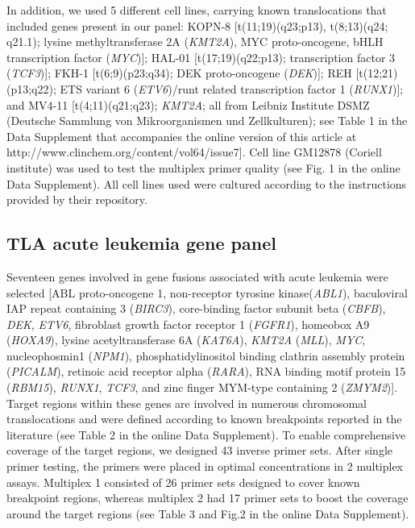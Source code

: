 In addition, we used 5 different cell lines, carrying known translocations that included genes present in our panel: KOPN-8 [t(11;19)(q23;p13), t(8;13)(q24; q21.1); lysine methyltransferase 2A (\textsl{KMT2A}), MYC proto-oncogene, bHLH transcription factor (\textsl{MYC})]; HAL-01 [t(17;19)(q22;p13); transcription factor 3 (\textsl{TCF3})]; FKH-1 [t(6;9)(p23;q34); DEK proto-oncogene (\textsl{DEK})]; REH [t(12;21)(p13;q22); ETS variant 6 (\textsl{ETV6})/runt related transcription factor 1 (\textsl{RUNX1})]; and MV4-11 [t(4;11)(q21;q23); \textsl{KMT2A}; all from Leibniz Institute DSMZ (Deutsche Sammlung von Mikroorganismen und Zellkulturen); see Table 1 in the Data Supplement that accompanies the online version of this article at http://www.clinchem.org/content/vol64/issue7]. 
Cell line GM12878 (Coriell institute) was used to test the multiplex primer quality (see Fig. 1 in the online Data Supplement). 
All cell lines used were cultured according to the instructions provided by their repository.

\subsection{TLA acute leukemia gene panel}
Seventeen genes involved in gene fusions associated with acute leukemia were selected [ABL proto-oncogene 1, non-receptor tyrosine kinase(\textsl{ABL1}), baculoviral IAP repeat containing 3 (\textsl{BIRC3}), core-binding factor subunit beta (\textsl{CBFB}), \textsl{DEK}, \textsl{ETV6}, fibroblast growth factor receptor 1 (\textsl{FGFR1}), homeobox A9 (\textsl{HOXA9}), lysine acetyltransferase 6A (\textsl{KAT6A}), \textsl{KMT2A} (\textsl{MLL}), \textsl{MYC}, nucleophosmin1 (\textsl{NPM1}), phosphatidylinositol binding clathrin assembly protein (\textsl{PICALM}), retinoic acid receptor alpha (\textsl{RARA}), RNA binding motif protein 15 (\textsl{RBM15}), \textsl{RUNX1}, \textsl{TCF3}, and zinc finger MYM-type containing 2 (\textsl{ZMYM2})]. 
Target regions within these genes are involved in numerous chromosomal translocations and were defined according to known breakpoints reported in the literature \cite{Shaffer_2012, Mitelman_2017, Mertens_2015, Duncavage_2012, Bohlander_2000} (see Table 2 in the online Data Supplement).
To enable comprehensive coverage of the target regions, we designed 43 inverse primer sets. 
After single primer testing, the primers were placed in optimal concentrations in 2 multiplex assays. 
Multiplex 1 consisted of 26 primer sets designed to cover known breakpoint regions, whereas multiplex 2 had 17 primer sets to boost the coverage around the target regions (see Table 3 and Fig.2 in the online Data Supplement).

